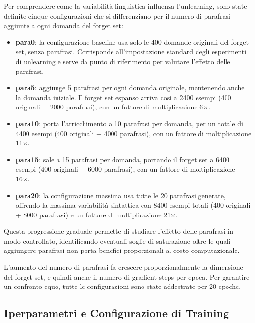 Per comprendere come la variabilità linguistica influenza l'unlearning, sono state definite cinque configurazioni che si differenziano per il numero di parafrasi aggiunte a ogni domanda del forget set:

\begin{itemize}
    \item \textbf{para0}: la configurazione baseline usa solo le 400 domande originali del forget set, senza parafrasi. Corrisponde all'impostazione standard degli esperimenti di unlearning e serve da punto di riferimento per valutare l'effetto delle parafrasi.
    
    \item \textbf{para5}: aggiunge 5 parafrasi per ogni domanda originale, mantenendo anche la domanda iniziale. Il forget set espanso arriva così a 2400 esempi (400 originali + 2000 parafrasi), con un fattore di moltiplicazione 6×.
    
    \item \textbf{para10}: porta l'arricchimento a 10 parafrasi per domanda, per un totale di 4400 esempi (400 originali + 4000 parafrasi), con un fattore di moltiplicazione 11×.
    
    \item \textbf{para15}: sale a 15 parafrasi per domanda, portando il forget set a 6400 esempi (400 originali + 6000 parafrasi), con un fattore di moltiplicazione 16×.
    
    \item \textbf{para20}: la configurazione massima usa tutte le 20 parafrasi generate, offrendo la massima variabilità sintattica con 8400 esempi totali (400 originali + 8000 parafrasi) e un fattore di moltiplicazione 21×.
\end{itemize}

Questa progressione graduale permette di studiare l'effetto delle parafrasi in modo controllato, identificando eventuali soglie di saturazione oltre le quali aggiungere parafrasi non porta benefici proporzionali al costo computazionale.

L'aumento del numero di parafrasi fa crescere proporzionalmente la dimensione del forget set, e quindi anche il numero di gradient steps per epoca. Per garantire un confronto equo, tutte le configurazioni sono state addestrate per 20 epoche.

\subsection{Iperparametri e Configurazione di Training}

